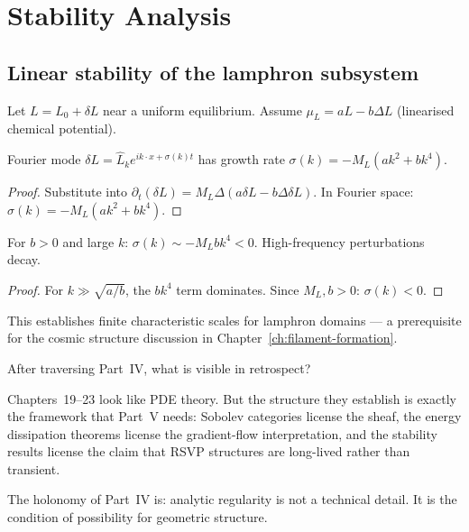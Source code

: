 
\chapter{Stability Analysis}
\label{ch:stability}

\section{Linear stability of the lamphron subsystem}

Let $L = L_0 + \delta L$ near a uniform equilibrium.
Assume $\mu_L = aL - b\Delta L$ (linearised chemical potential).

\begin{proposition}
  \label{prop:lamphron-stability}
  \statusproven{}
  Fourier mode $\delta L = \hat{L}_k e^{ik\cdot x + \sigma(k)t}$
  has growth rate $\sigma(k) = -M_L(ak^2 + bk^4)$.
\end{proposition}

\begin{proof}
  Substitute into $\partial_t(\delta L) = M_L\Delta(a\delta L - b\Delta\delta L)$.
  In Fourier space: $\sigma(k) = -M_L(ak^2 + bk^4)$.
\end{proof}

\begin{proposition}
  \label{prop:hf-stable}
  \statusproven{}
  For $b > 0$ and large $k$: $\sigma(k) \sim -M_L bk^4 < 0$.
  High-frequency perturbations decay.
\end{proposition}

\begin{proof}
  For $k \gg \sqrt{a/b}$, the $bk^4$ term dominates.
  Since $M_L, b > 0$: $\sigma(k) < 0$.
\end{proof}

This establishes finite characteristic scales for lamphron
domains — a prerequisite for the cosmic structure discussion
in Chapter~\ref{ch:filament-formation}.

\begin{HolonomyNote}
  After traversing Part~IV, what is visible in retrospect?

  Chapters~19--23 look like PDE theory.
  But the structure they establish is exactly the framework
  that Part~V needs: Sobolev categories license the sheaf,
  the energy dissipation theorems license the gradient-flow
  interpretation, and the stability results license the
  claim that RSVP structures are long-lived rather than
  transient.

  The holonomy of Part~IV is: analytic regularity is not a
  technical detail.
  It is the condition of possibility for geometric structure.
\end{HolonomyNote}
